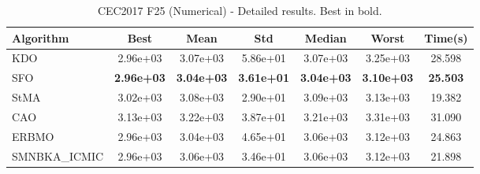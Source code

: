 \begin{table}[H]
\centering\small
\caption{CEC2017 F25 (Numerical) - Detailed results. Best in bold.}
\label{tab:cec2017_F25}
\begin{tabular}{lcccccc}
\toprule
\textbf{Algorithm} & \textbf{Best} & \textbf{Mean} & \textbf{Std} & \textbf{Median} & \textbf{Worst} & \textbf{Time(s)} \\
\midrule
KDO & 2.96e+03 & 3.07e+03 & 5.86e+01 & 3.07e+03 & 3.25e+03 & 28.598 \\
SFO & \textbf{2.96e+03} & \textbf{3.04e+03} & \textbf{3.61e+01} & \textbf{3.04e+03} & \textbf{3.10e+03} & \textbf{25.503} \\
StMA & 3.02e+03 & 3.08e+03 & 2.90e+01 & 3.09e+03 & 3.13e+03 & 19.382 \\
CAO & 3.13e+03 & 3.22e+03 & 3.87e+01 & 3.21e+03 & 3.31e+03 & 31.090 \\
ERBMO & 2.96e+03 & 3.04e+03 & 4.65e+01 & 3.06e+03 & 3.12e+03 & 24.863 \\
SMNBKA_ICMIC & 2.96e+03 & 3.06e+03 & 3.46e+01 & 3.06e+03 & 3.12e+03 & 21.898 \\
\bottomrule
\end{tabular}
\end{table}
